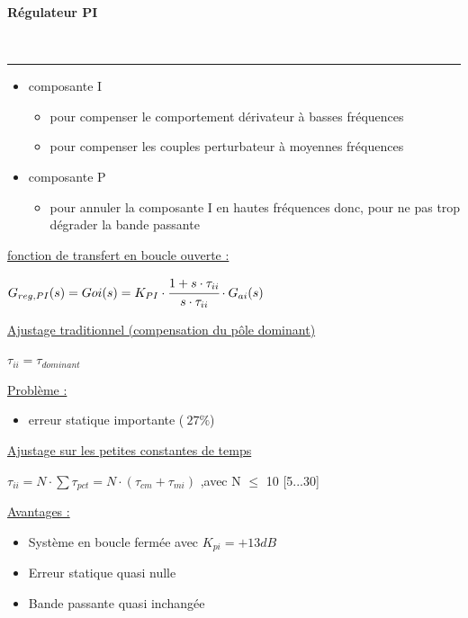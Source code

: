 \documentclass[	DIV=calc,%
							paper=a4,%
							fontsize=10pt,%
							twocolumn]{scrartcl} %
\newcounter{mycounter}
\newcommand{\formdesc}[1]{\large\textbf{#1} \addtocounter{mycounter}{1} \hfill \themycounter \\ \vspace{-3mm} \hrule \vspace{2mm}}
\newcommand{\formtitle}[1]{\large\underline{#1}}
\begin{document}
\formdesc{Régulateur PI}

\begin{itemize}
    \item composante I    
        \begin{itemize}
            \item pour compenser le comportement dérivateur à basses fréquences
            \item pour compenser les couples perturbateur à moyennes fréquences
        \end{itemize}
    \item composante P  
    \begin{itemize}
        \item pour annuler la composante I en hautes fréquences donc, pour ne pas trop dégrader la bande passante
    \end{itemize}
\end{itemize}

\formtitle{fonction de transfert en boucle ouverte : }

\vspace{3mm}

{ $G_{reg,{PI}}(s) = Goi(s) =  K_{PI} \cdot \cfrac{1+s\cdot\tau_{ii}}{s\cdot\tau_{ii}} \cdot G_{ai}(s) $}

\vspace{3mm}

\formtitle{Ajustage traditionnel (compensation du pôle dominant)}

\vspace{3mm}
$\tau_{ii} = \tau_{dominant}$
\vspace{3mm}

\underline{Problème :}
\begin{itemize}
    \item  erreur statique importante ($~27\%$)
\end{itemize}

\formtitle{Ajustage sur les petites constantes de temps}

\vspace{3mm}
$\tau_{ii} = N \cdot \sum\tau_{pct} = N \cdot (\tau_{cm}+ \tau_{mi})$ ,avec N $\leq$ 10 [5...30]

\underline{Avantages :}
\begin{itemize}
    \item Système en boucle fermée avec $K_{pi} = +13 dB$
    \item Erreur statique quasi nulle
    \item Bande passante quasi inchangée
\end{itemize}
\end{document}
